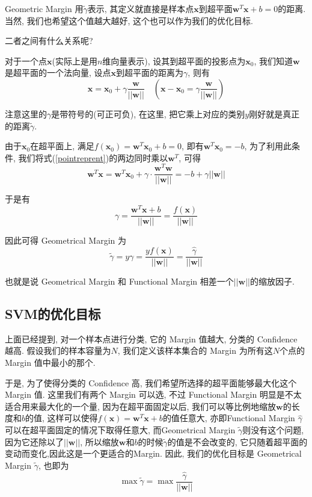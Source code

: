 \documentclass[a4paper,UTF8]{ctexart}
\theoremstyle{plain} \newtheorem{theorem}{定理}[section]
\theoremstyle{plain} \newtheorem{definition}{定义}[section]
\theoremstyle{plain} \newtheorem{lemma}{引理}[section]
\theoremstyle{plain} \newtheorem{proposition}{命题}[section]
\theoremstyle{plain} \newtheorem{example}{例}
\theoremstyle{plain} \newtheorem{remark}{注}
\theoremstyle{plain} \newtheorem{corollary}{推论}[section]
\begin{document}
Geometric Margin 用$\tilde{\gamma}$表示, 其定义就直接是样本点$\bm{x}$到超平面$\bm{w}^{T} \bm{x} + b = 0$的距离. 当然, 我们也希望这个值越大越好, 这个也可以作为我们的优化目标.

二者之间有什么关系呢?

对于一个点$\bm{x}$(实际上是用$n$维向量表示), 设其到超平面的投影点为$\bm{x}_{0}$, 我们知道$\bm{w}$是超平面的一个法向量, 设点$\bm{x}$到超平面的距离为$\gamma$, 则有
\begin{equation}\label{pointreprent}
\bm{x} = \bm{x}_{0} + \gamma \frac{\bm{w}}{||\bm{w}||} \quad (\bm{x} - \bm{x}_{0} = \gamma \frac{\bm{w}}{||\bm{w}||})
\end{equation}

注意这里的$\gamma$是带符号的(可正可负), 在这里, 把它乘上对应的类别$y$刚好就是真正的距离$\tilde{\gamma}$.

由于$\bm{x}_{0}$在超平面上, 满足$f(\bm{x}_{0}) = \bm{w}^{T} \bm{x}_{0} + b = 0$, 即有$\bm{w}^{T} \bm{x}_{0} = -b$, 为了利用此条件, 我们将式(\ref{pointreprent})的两边同时乘以$\bm{w}^{T}$, 可得
\begin{equation*}
\bm{w}^{T} \bm{x}  = \bm{w}^{T} \bm{x}_{0} + \gamma \cdot \frac{\bm{w}^{T} \bm{w}}{||\bm{w}||} = -b + \gamma ||\bm{w}||
\end{equation*}

于是有
\begin{equation*}
\gamma = \frac{\bm{w}^{T} \bm{x} + b}{||\bm{w}||} = \frac{f(\bm{x})}{||\bm{w}||}
\end{equation*}

因此可得 Geometrical Margin 为
\begin{equation*}
\tilde{\gamma} = y \gamma  = \frac{y f(\bm{x})}{||\bm{w}||} = \frac{\hat{\gamma}}{||\bm{w}||}
\end{equation*}

也就是说 Geometrical Margin 和 Functional Margin 相差一个$||\bm{w}||$的缩放因子.


\subsection{SVM的优化目标}
上面已经提到, 对一个样本点进行分类, 它的 Margin 值越大, 分类的 Confidence 越高. 假设我们的样本容量为$N$, 我们定义该样本集合的 Margin 为所有这$N$个点的 Margin 值中最小的那个.

于是, 为了使得分类的 Confidence 高, 我们希望所选择的超平面能够最大化这个 Margin 值. 这里我们有两个 Margin 可以选, 不过 Functional Margin 明显是不太适合用来最大化的一个量, 因为在超平面固定以后, 我们可以等比例地缩放$\bm{w}$的长度和$b$的值, 这样可以使得$f(\bm{x}) = \bm{w}^{T} \bm{x} + b$的值任意大, 亦即Functional Margin $\hat{\gamma}$可以在超平面固定的情况下取得任意大, 而Geometrical Margin $\tilde{\gamma}$则没有这个问题, 因为它还除以了$||\bm{w}||$, 所以缩放$\bm{w}$和$b$的时候$\tilde{\gamma}$的值是不会改变的, 它只随着超平面的变动而变化,因此这是一个更适合的Margin. 因此, 我们的优化目标是 Geometrical Margin $\tilde{\gamma}$, 也即为
\begin{equation*}
\max \tilde{\gamma} = \max \frac{\hat{\gamma}}{||\bm{w}||}
\end{equation*}
\end{document}
